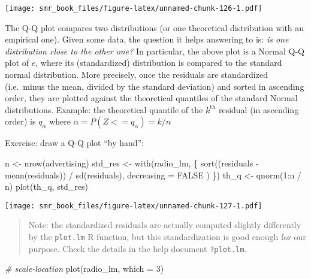 \documentclass[
  oneside]{book}
\newenvironment{Shaded}{\begin{snugshade}}{\end{snugshade}}
\newcommand{\AttributeTok}[1]{\textcolor[rgb]{0.77,0.63,0.00}{#1}}
\newcommand{\CommentTok}[1]{\textcolor[rgb]{0.56,0.35,0.01}{\textit{#1}}}
\newcommand{\ConstantTok}[1]{\textcolor[rgb]{0.00,0.00,0.00}{#1}}
\newcommand{\DecValTok}[1]{\textcolor[rgb]{0.00,0.00,0.81}{#1}}
\newcommand{\FunctionTok}[1]{\textcolor[rgb]{0.00,0.00,0.00}{#1}}
\newcommand{\NormalTok}[1]{#1}
\newcommand{\OtherTok}[1]{\textcolor[rgb]{0.56,0.35,0.01}{#1}}
\newcommand{\SpecialCharTok}[1]{\textcolor[rgb]{0.00,0.00,0.00}{#1}}
\begin{document}
\texttt{[image: smr\_book\_files/figure-latex/unnamed-chunk-126-1.pdf]}

The Q-Q plot compares two distributions (or one theoretical distribution
with an empirical one). Given some data, the question it helps
answering to is: \emph{is one distribution close to the other one?}
In particular, the above plot is a Normal Q-Q plot of \(e\),
where its (standardized) distribution is compared to the standard
normal distribution.
More precisely, once the residuals are standardized (i.e.~minus the mean,
divided by the standard deviation) and sorted in ascending order, they are
plotted against the theoretical quantiles of the standard Normal distributions.
Example: the theoretical quantile of the \(k^{\text{th}}\) residual (in ascending
order) is \(q_{\alpha}\) where \(\alpha = P(Z <= q_{\alpha}) = k / n\)

Exercise: draw a Q-Q plot ``by hand'':

\begin{Shaded}
\begin{Highlighting}[]
\NormalTok{n }\OtherTok{\textless{}{-}} \FunctionTok{nrow}\NormalTok{(advertising)}
\NormalTok{std\_res }\OtherTok{\textless{}{-}} \FunctionTok{with}\NormalTok{(radio\_lm, \{}
  \FunctionTok{sort}\NormalTok{((residuals }\SpecialCharTok{{-}} \FunctionTok{mean}\NormalTok{(residuals)) }\SpecialCharTok{/} \FunctionTok{sd}\NormalTok{(residuals),}
    \AttributeTok{decreasing =} \ConstantTok{FALSE}
\NormalTok{  )}
\NormalTok{\})}
\NormalTok{th\_q }\OtherTok{\textless{}{-}} \FunctionTok{qnorm}\NormalTok{(}\DecValTok{1}\SpecialCharTok{:}\NormalTok{n }\SpecialCharTok{/}\NormalTok{ n)}
\FunctionTok{plot}\NormalTok{(th\_q, std\_res)}
\end{Highlighting}
\end{Shaded}

\texttt{[image: smr\_book\_files/figure-latex/unnamed-chunk-127-1.pdf]}

\begin{quote}
Note: the standardized residuals are actually computed slightly
differently by the \texttt{plot.lm} R function, but this standardization
is good enough for our purpose. Check the details in the help
document \texttt{?plot.lm}.
\end{quote}

\begin{Shaded}
\begin{Highlighting}[]
\CommentTok{\# scale{-}location}
\FunctionTok{plot}\NormalTok{(radio\_lm, }\AttributeTok{which =} \DecValTok{3}\NormalTok{)}
\end{Highlighting}
\end{Shaded}
\end{document}
